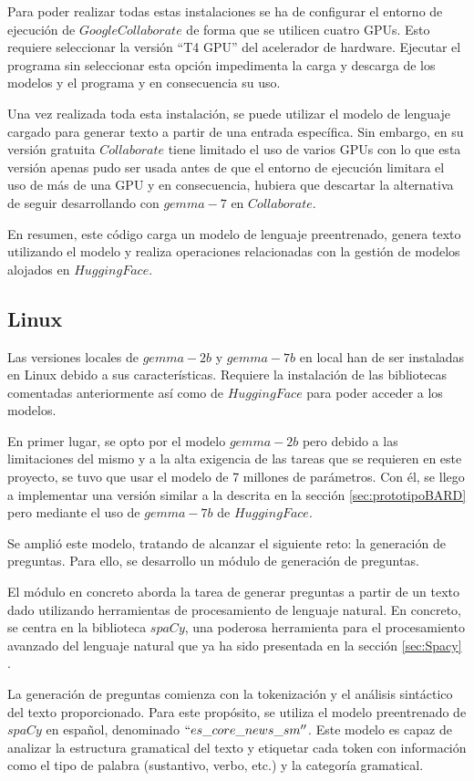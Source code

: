 Para poder realizar todas estas instalaciones se ha de configurar el entorno de ejecución de $Google Collaborate$ de forma que se utilicen cuatro GPUs. Esto requiere seleccionar la versión ``T4 GPU'' del acelerador de hardware. Ejecutar el programa sin seleccionar esta opción impedimenta la carga y descarga de los modelos y el programa y en consecuencia su uso. 

Una vez realizada toda esta instalación, se puede utilizar el modelo de lenguaje cargado para generar texto a partir de una entrada específica. Sin embargo, en su versión gratuita $Collaborate$ tiene limitado el uso de varios GPUs con lo que esta versión apenas pudo ser usada antes de que el entorno de ejecución limitara el uso de más de una GPU y en consecuencia, hubiera que descartar la alternativa de seguir desarrollando con $gemma-7$ en $Collaborate$.

En resumen, este código carga un modelo de lenguaje preentrenado, genera texto utilizando el modelo y realiza operaciones relacionadas con la gestión de modelos alojados en $Hugging Face$.

\subsection{Linux}
Las versiones locales de $gemma-2b$ y $gemma-7b$ en local han de ser instaladas en Linux debido a sus características. Requiere la instalación de las bibliotecas comentadas anteriormente así como de $Hugging Face$ para poder acceder a los modelos. 

En primer lugar, se opto por el modelo $gemma-2b$ pero debido a las limitaciones del mismo y a la alta exigencia de las tareas que se requieren en este proyecto, se tuvo que usar el modelo de 7 millones de parámetros. Con él, se llego a implementar una versión similar a la descrita en la sección \ref{sec:prototipoBARD} pero mediante el uso de $gemma-7b$ de $Hugging Face$. 

Se amplió este modelo, tratando de alcanzar el siguiente reto: la generación de preguntas. Para ello, se desarrollo un módulo de generación de preguntas.

El módulo en concreto aborda la tarea de generar preguntas a partir de un texto dado utilizando herramientas de procesamiento de lenguaje natural. En concreto, se centra en la biblioteca $spaCy$, una poderosa herramienta para el procesamiento avanzado del lenguaje natural que ya ha sido presentada en la sección \ref{sec:Spacy} .

La generación de preguntas comienza con la tokenización y el análisis sintáctico del texto proporcionado. Para este propósito, se utiliza el modelo preentrenado de $spaCy$ en español, denominado \textit{$``es\_core\_news\_sm''$}. Este modelo es capaz de analizar la estructura gramatical del texto y etiquetar cada token con información como el tipo de palabra (sustantivo, verbo, etc.) y la categoría gramatical.

